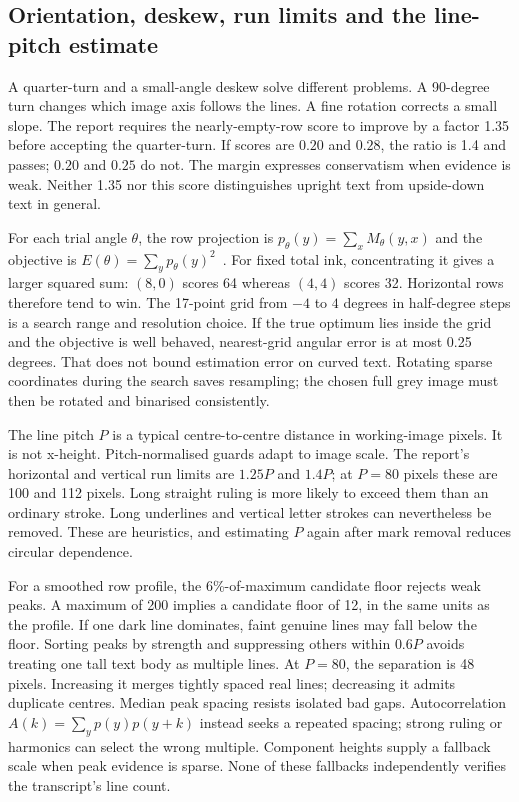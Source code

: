 \subsection{Orientation, deskew, run limits and the line-pitch estimate}
A quarter-turn and a small-angle deskew solve different problems. A 90-degree
turn changes which image axis follows the lines. A fine rotation corrects a
small slope. The report requires the nearly-empty-row score to improve by
a factor 1.35 before accepting the quarter-turn. If scores are $0.20$ and
$0.28$, the ratio is 1.4 and passes; $0.20$ and $0.25$ do not. The margin
expresses conservatism when evidence is weak. Neither 1.35 nor this score
distinguishes upright text from upside-down text in general.

For each trial angle $\theta$, the row projection is
$p_\theta(y)=\sum_x M_\theta(y,x)$ and the objective is
$E(\theta)=\sum_y p_\theta(y)^2$~\cite{postl1986}.
For fixed total ink, concentrating it gives a larger squared sum:
$(8,0)$ scores 64 whereas $(4,4)$ scores 32. Horizontal rows therefore tend
to win. The 17-point grid from $-4$ to $4$ degrees in half-degree steps
is a search range and resolution choice. If the true optimum lies inside
the grid and the objective is well behaved, nearest-grid angular error is
at most 0.25 degrees. That does not bound estimation error on curved text.
Rotating sparse coordinates during the search saves resampling; the chosen
full grey image must then be rotated and binarised consistently.

The line pitch $P$ is a typical centre-to-centre distance in working-image
pixels. It is not x-height. Pitch-normalised guards adapt to image scale.
The report's horizontal and vertical run limits are $1.25P$ and $1.4P$;
at $P=80$ pixels these are 100 and 112 pixels. Long straight ruling is
more likely to exceed them than an ordinary stroke. Long underlines and
vertical letter strokes can nevertheless be removed. These are heuristics,
and estimating $P$ again after mark removal reduces circular dependence.

For a smoothed row profile, the 6\%-of-maximum candidate floor rejects weak
peaks. A maximum of 200 implies a candidate floor of 12, in the same units
as the profile. If one dark line dominates, faint genuine lines may fall
below the floor. Sorting peaks by strength and suppressing others within
$0.6P$ avoids treating one tall text body as multiple lines. At $P=80$,
the separation is 48 pixels. Increasing it merges tightly spaced real lines;
decreasing it admits duplicate centres. Median peak spacing resists isolated
bad gaps. Autocorrelation $A(k)=\sum_y p(y)p(y+k)$ instead seeks a repeated
spacing; strong ruling or harmonics can select the wrong multiple. Component
heights supply a fallback scale when peak evidence is sparse. None of these
fallbacks independently verifies the transcript's line count.

